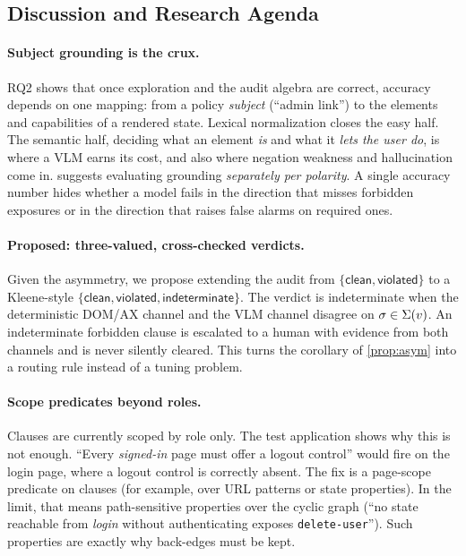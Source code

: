 \subsection{Discussion and Research Agenda}
\label{sec:discussion}

\paragraph{Subject grounding is the crux.}
RQ2 shows that once exploration and the audit algebra are correct, accuracy
depends on one mapping: from a policy \emph{subject} (``admin link'') to the
elements and capabilities of a rendered state. Lexical normalization closes
the easy half. The semantic half, deciding what an element \emph{is} and what
it \emph{lets the user do}, is where a VLM earns its cost, and also where
negation weakness and hallucination come in.  suggests
evaluating grounding \emph{separately per polarity}. A single accuracy number
hides whether a model fails in the direction that misses forbidden exposures
or in the direction that raises false alarms on required ones.

\paragraph{Proposed: three-valued, cross-checked verdicts.}
Given the asymmetry, we propose extending the audit from $\{\textsf{clean},
\textsf{violated}\}$ to a Kleene-style $\{\textsf{clean}, \textsf{violated},
\textsf{indeterminate}\}$. The verdict is \textsf{indeterminate} when the
deterministic DOM/AX channel and the VLM channel disagree on $\sigma\in\Sigma(v)$.
An indeterminate forbidden clause is escalated to a human with evidence from
both channels and is never silently cleared. This turns the corollary of
\cref{prop:asym} into a routing rule instead of a tuning problem.

\paragraph{Scope predicates beyond roles.}
Clauses are currently scoped by role only. The test application shows why this
is not enough. ``Every \emph{signed-in} page must offer a logout control'' would
fire on the login page, where a logout control is correctly absent. The fix is
a page-scope predicate on clauses (for example, over URL patterns or state
properties). In the limit, that means path-sensitive properties over the
cyclic graph (``no state reachable from \emph{login} without authenticating
exposes \texttt{delete-user}''). Such properties are exactly why back-edges
must be kept.

